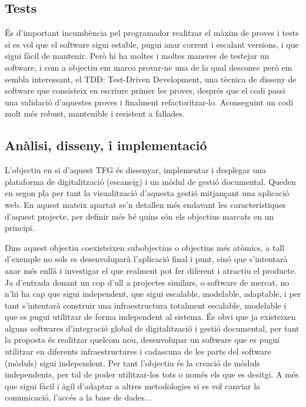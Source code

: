 \documentclass[letterpaper,11pt,catalan]{sphinxmanual}
\begin{document}
\subsection{Tests}
\label{\detokenize{index:tests}}
És d'important incumbència pel programador realitzar el màxim de proves i tests si es vol que
el software sigui estable, pugui anar corrent i escalant versions, i que sigui fàcil de mantenir.
Però hi ha moltes i moltes maneres de testejar un software, i com a objectiu em marco provar-ne
una de la qual desconec però em sembla interessant, el TDD: Test-Driven Development, una tècnica
de disseny de software que consisteix en escriure primer les proves, després que el codi passi una
validació d'aquestes proves i finalment refactoritzar-lo. Aconseguint un codi molt més robust,
mantenible i resistent a fallades.


\subsection{Anàlisi, disseny, i implementació}
\label{\detokenize{index:analisi-disseny-i-implementacio}}
L'objectiu en si d'aquest TFG és dissenyar, implementar i desplegar una plataforma de
digitalització (escaneig) i un mòdul de gestió documental. Queden en segon pla per tant
la visualització d'aquesta gestió mitjançant una aplicació web. En aquest mateix apartat
se'n detallen més endavant les característiques d'aquest projecte, per definir més bé
quins són els objectius marcats en un principi.

Dins aquest objectiu coexisteixen subobjectius o objectius més atòmics, a tall d'exemple
no sols es desenvoluparà l'aplicació final i punt, sinó que s'intentarà anar més enllà i
investigar el que realment pot fer diferent i atractiu el producte. Ja d'entrada donant un cop
d'ull a projectes similars, o software de mercat, no n'hi ha cap que sigui \sphinxquotedblleft{}independent\sphinxquotedblright{}, que
sigui escalable, modelable, adaptable, i per tant s'intentarà construir una
infraestructura totalment escalable, modelable i que es pugui utilitzar de forma independent
al sistema. És obvi que ja existeixen alguns softwares d'integració global de digitalització
i gestió documental, per tant la proposta és realitzar quelcom nou, desenvolupar un software
que es pugui utilitzar en diferents infraestructures i cadascuna de les parts del software (mòduls)
sigui independent. Per tant l'objectiu és la creació de mòduls independents, per tal de poder
utilitzar-los tots o només els que es desitgi. A més que sigui fàcil i àgil d'adaptar a altres
metodologies si es vol canviar la comunicació, l'accés a la base de dades...
\end{document}
